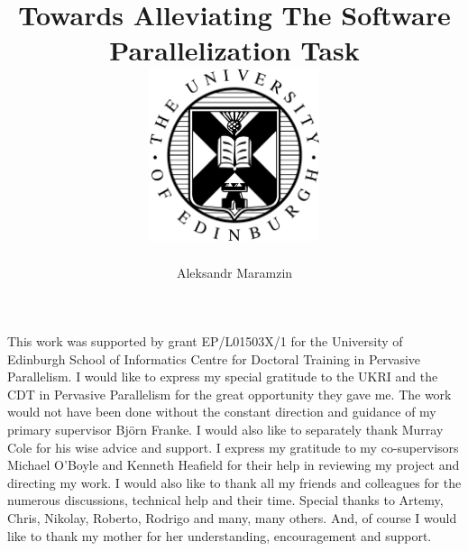 \documentclass[mphil,icsa]{infthesis}
\title{
{Towards Alleviating The Software Parallelization Task}\\
{\includegraphics[width=50mm,scale=0.5]{eushield-normal.pdf}}
}
\author{Aleksandr Maramzin}
\begin{document}
\begin{preliminary}

\maketitle

\begin{acknowledgements}
\quad This work was supported by grant EP/L01503X/1 for the University of Edinburgh School of Informatics Centre for Doctoral Training in Pervasive Parallelism. I would like to express my special gratitude to the UKRI and the CDT in Pervasive Parallelism for the great opportunity they gave me.\newline\null
\quad The work would not have been done without the constant direction and guidance of my primary supervisor Bj\"{o}rn Franke. I would also like to separately thank Murray Cole for his wise advice and support. I express my gratitude to my co-supervisors Michael O'Boyle and Kenneth Heafield for their help in reviewing my project and directing my work.\newline\null
\quad I would also like to thank all my friends and colleagues for the numerous discussions, technical help and their time. Special thanks to Artemy, Chris, Nikolay, Roberto, Rodrigo and many, many others. And, of course I would like to thank my mother for her understanding, encouragement and support.
\end{acknowledgements}

\standarddeclaration


\tableofcontents


\end{preliminary}



% 




\end{document}
